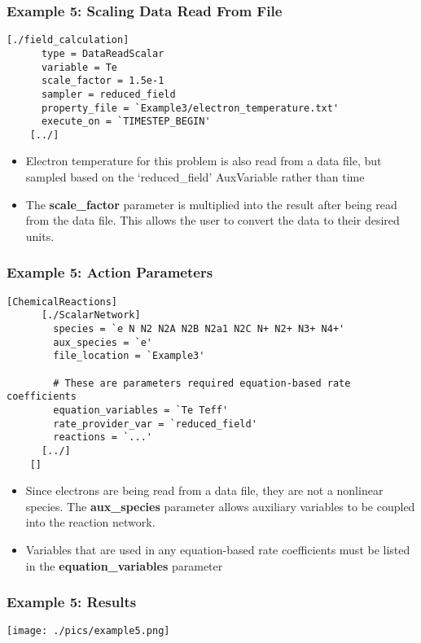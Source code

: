 \begin{frame}[fragile]
	\frametitle{Example 5: Scaling Data Read From File}
	\begin{Verbatim}[fontsize=\scriptsize]
    [./field_calculation]
      type = DataReadScalar
      variable = Te
      scale_factor = 1.5e-1
      sampler = reduced_field
      property_file = `Example3/electron_temperature.txt'
      execute_on = `TIMESTEP_BEGIN'
    [../]
	\end{Verbatim}
	\begin{itemize}
		\item Electron temperature for this problem is also read from a data file, but sampled based on the `reduced\_field' AuxVariable rather than time
		\item The \textbf{scale\_factor} parameter is multiplied into the result after being read from the data file. This allows the user to convert the data to their desired units.
	\end{itemize}
\end{frame}

\begin{frame}[fragile]
	\frametitle{Example 5: Action Parameters}
	\begin{Verbatim}[fontsize=\tiny]
    [ChemicalReactions]
      [./ScalarNetwork]
        species = `e N N2 N2A N2B N2a1 N2C N+ N2+ N3+ N4+'
        aux_species = `e'
        file_location = `Example3'

        # These are parameters required equation-based rate coefficients
        equation_variables = `Te Teff'
        rate_provider_var = `reduced_field'
        reactions = `...'
      [../]
    []
	\end{Verbatim}
	\begin{itemize}
		\item Since electrons are being read from a data file, they are not a nonlinear species. The \textbf{aux\_species} parameter allows auxiliary variables to be coupled into the reaction network.
		\item Variables that are used in any equation-based rate coefficients must be listed in the \textbf{equation\_variables} parameter
	\end{itemize}
\end{frame}

\begin{frame}
	\frametitle{Example 5: Results}
	\centering
	\texttt{[image: ./pics/example5.png]}
\end{frame}